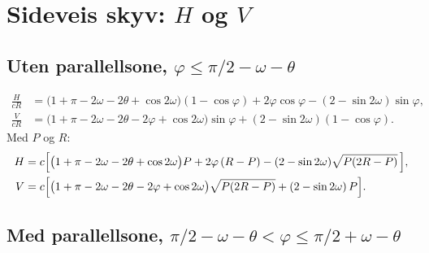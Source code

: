 \documentclass[11pt,a4paper]{article}
\begin{document}
\section{Sideveis skyv: $H$ og $V$}
\label{sec:push}

\subsection*{Uten parallellsone, $\varphi \le \pi/2 - \omega - \theta$}

\begin{align}
  \frac{H}{cR} &= \bigl(1 + \pi - 2\omega - 2\theta + \cos 2\omega\bigr)(1-\cos\varphi)
                  + 2\varphi\cos\varphi - (2 - \sin 2\omega)\sin\varphi ,
  \label{eq:H}\\[4pt]
  \frac{V}{cR} &= \bigl(1 + \pi - 2\omega - 2\theta - 2\varphi + \cos 2\omega\bigr)\sin\varphi
                  + (2 - \sin 2\omega)(1-\cos\varphi) .
  \label{eq:V}
\end{align}
Med $P$ og $R$:
\begin{align}
  H &= c\Bigl[\bigl(1 + \pi - 2\omega - 2\theta + \cos 2\omega\bigr)P
        + 2\varphi\,(R-P) - (2 - \sin 2\omega)\sqrt{P(2R-P)}\,\Bigr], \\
  V &= c\Bigl[\bigl(1 + \pi - 2\omega - 2\theta - 2\varphi + \cos 2\omega\bigr)\sqrt{P(2R-P)}
        + (2 - \sin 2\omega)\,P\Bigr].
\end{align}

\subsection*{Med parallellsone, $\pi/2 - \omega - \theta < \varphi \le \pi/2 + \omega - \theta$}
\end{document}
